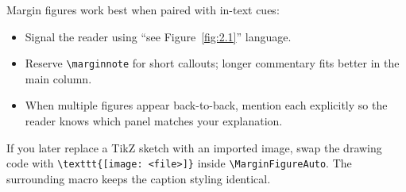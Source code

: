 \label{sec:inline-callouts}

Margin figures work best when paired with in-text cues:
\begin{itemize}[leftmargin=1.8em]
  \item Signal the reader using ``see Figure~\ref{fig:2.1}'' language.
  \item Reserve \verb|\marginnote| for short callouts; longer commentary fits better
        in the main column.
  \item When multiple figures appear back-to-back, mention each explicitly so the
        reader knows which panel matches your explanation.
\end{itemize}

If you later replace a TikZ sketch with an imported image, swap the drawing code
with \verb|\texttt{[image: <file>]}| inside
\verb|\MarginFigureAuto|. The surrounding macro keeps the caption styling identical.
